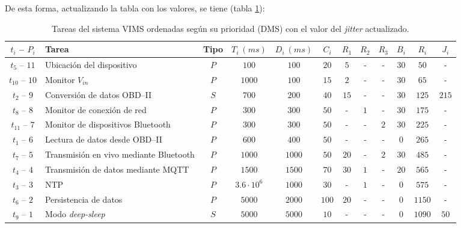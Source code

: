 De esta forma, actualizando la tabla con los valores, se tiene (tabla \ref{tab:rt-table-jitter}):

\begin{table}[H]
  \centering
  \begin{tabularx}{\linewidth}{c|X|c|c|c|c|c|c|c|c|c|c}
    $t_i$ -- $P_i$   & \textbf{Tarea}                         & \textbf{Tipo} & $T_i~\left(ms\right)$ & $D_i~\left(ms\right)$ & $C_i$ & $R_1$ & $R_2$ & $R_3$ & $B_i$ & $R_i$  & $J_i$ \\
    \hline\hline
    $t_{5}$ -- $11$  & Ubicación del dispositivo              & $P$           & $100$                 & $100$                 & $20$  & $5$   & -     & -     & $30$  & $50$   & -     \\
    $t_{10}$ -- $10$ & Monitor $V_{in}$                       & $P$           & $1000$                & $100$                 & $15$  & $2$   & -     & -     & $30$  & $65$   & -     \\
    $t_{2}$ -- $9$   & Conversión de datos \ac{OBD}--II       & $S$           & $700$                 & $200$                 & $40$  & $15$  & -     & -     & $30$  & $125$  & $215$ \\
    $t_{8}$ -- $8$   & Monitor de conexión de red             & $P$           & $300$                 & $300$                 & $50$  & -     & $1$   & -     & $30$  & $175$  & -     \\
    $t_{11}$ -- $7$  & Monitor de dispositivos Bluetooth      & $P$           & $300$                 & $300$                 & $50$  & -     & -     & $2$   & $30$  & $225$  & -     \\
    $t_{1}$ -- $6$   & Lectura de datos desde \ac{OBD}--II    & $P$           & $600$                 & $400$                 & $50$  & -     & -     & -     & $0$   & $265$  & -     \\
    $t_{7}$ -- $5$   & Transmisión en vivo mediante Bluetooth & $P$           & $1000$                & $1000$                & $50$  & $20$  & -     & $2$   & $30$  & $485$  & -     \\
    $t_{4}$ -- $4$   & Transmisión de datos mediante MQTT     & $P$           & $1500$                & $1500$                & $70$  & $30$  & $1$   & -     & $20$  & $565$  & -     \\
    $t_{3}$ -- $3$   & NTP                                    & $P$           & $3.6 \cdot 10^6$      & $1000$                & $30$  & -     & $1$   & -     & $0$   & $575$  & -     \\
    $t_{6}$ -- $2$   & Persistencia de datos                  & $P$           & $5000$                & $2000$                & $100$ & $20$  & -     & -     & $0$   & $1150$ & -     \\
    $t_{9}$ -- $1$   & Modo \textit{deep-sleep}               & $S$           & $5000$                & $5000$                & $10$  & -     & -     & -     & $0$   & $1090$ & $50$  \\
    \hline
  \end{tabularx}
  \caption{Tareas del sistema \ac{VIMS} ordenadas según su prioridad (\ac{DMS}) con el valor del \textit{jitter} actualizado.}
  \label{tab:rt-table-jitter}
\end{table}

